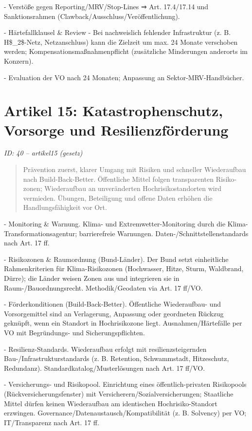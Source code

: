 \documentclass[12pt,a4paper]{scrartcl}
\begin{document}
- Verstöße gegen Reporting/MRV/Stop-Lines ⇒ Art. 17.4/17.14 und Sanktionsrahmen (Clawback/Ausschluss/Veröffentlichung).

- Härtefallklausel \& Review
- Bei nachweislich fehlender Infrastruktur (z. B. H\$\_2\$-Netz, Netzanschluss) kann die Zielzeit um max. 24 Monate verschoben werden; Kompensationsmaßnahmenpflicht (zusätzliche Minderungen anderorts im Konzern).

- Evaluation der VO nach 24 Monaten; Anpassung an Sektor-MRV-Handbücher.


\section[Artikel 15: Katastrophenschutz, Vorsorge und Resilienzförderung]{Artikel 15: Katastrophenschutz, Vorsorge und Resilienzförderung}
\noindent\textit{ID: 40 -- artikel15 (gesetz)}

\begin{quote}
Prävention zuerst, klarer Umgang mit Risiken und schneller Wiederaufbau nach Build-Back-Better. Öffentliche Mittel folgen transparenten Risiko­zonen; Wiederaufbau an unveränderten Hochrisiko­standorten wird vermieden. Übungen, Beteiligung und offene Daten erhöhen die Handlungsfähigkeit vor Ort.
\end{quote}

- Monitoring \& Warnung. Klima- und Extremwetter-Monitoring durch die Klima-Transformationsagentur; barrierefreie Warnungen. Daten-/Schnittstellenstandards nach Art. 17 ff.

- Risikozonen \& Raumordnung (Bund-Länder). Der Bund setzt einheitliche Rahmenkriterien für Klima-Risikozonen (Hochwasser, Hitze, Sturm, Waldbrand, Dürre); die Länder weisen Zonen aus und integrieren sie in Raum-/Bauordnungsrecht. Methodik/Geodaten via Art. 17 ff/VO.

- Förderkonditionen (Build-Back-Better). Öffentliche Wiederaufbau- und Vorsorgemittel sind an Verlagerung, Anpassung oder geordneten Rückzug geknüpft, wenn ein Standort in Hochrisikozone liegt. Ausnahmen/Härtefälle per VO mit Begründungs- und Sicherungspflichten.

- Resilienz-Standards. Wiederaufbau erfolgt mit resilienzsteigernden Bau-/Infrastrukturstandards (z. B. Retention, Schwammstadt, Hitzeschutz, Redundanz). Standardkatalog/Musterlösungen nach Art. 17 ff/VO.

- Versicherungs- und Risikopool. Einrichtung eines öffentlich-privaten Risikopools (Rückversicherungsfenster) mit Versicherern/Sozialversicherungen; Staatliche Mittel dürfen keinen Wiederaufbau am identischen Hochrisiko-Standort erzwingen. Governance/Datenaustausch/Kompatibilität (z. B. Solvency) per VO; IT/Transparenz nach Art. 17 ff.
\end{document}
